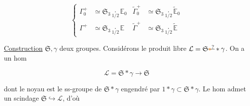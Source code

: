 
\[
 \left\{\begin{aligned}
 \Gamma_0^+&\simeq\mathfrak S_3\underset{1/2}{\cdot}\mathbb E_0&
 \widetilde\Gamma_0^+&\simeq\mathfrak S_3\underset{1/2}{\cdot}\widetilde{\mathbb E}_0\\
 \Gamma^+&\simeq\mathfrak S_3\underset{1/2}{\cdot}\mathbb E&
 \widetilde\Gamma^+&\simeq\mathfrak S_3\underset{1/2}{\cdot}\widetilde{\mathbb E}
 \end{aligned}\right.
\]


\uline{Construction}  $\mathfrak S,\gamma$ deux groupes. Considérons le produit libre $\mathcal L=\mathfrak S\deleted{\unsure{*}}*\gamma$. On a un hom

\[
 \mathcal L=\mathfrak S*\gamma\longrightarrow\mathfrak S
\]

dont le noyau est le ss-groupe  de  $\mathfrak S*\gamma$ engendré par $1*\gamma\subset\mathfrak S*\gamma$. Le  hom admet un scindage  $\mathfrak S\hookrightarrow\mathcal L$, d'où
